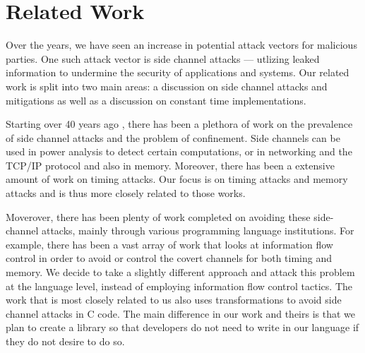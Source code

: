 \section{Related Work}
\label{sec:related}


Over the years, we have seen an increase in potential attack vectors for
malicious parties. One such attack vector is side channel attacks --- utlizing
leaked information to undermine the security of applications and systems.
Our related work is split into two main areas: a discussion on side channel
attacks and mitigations as well as a discussion on constant time
implementations.

Starting over 40 years ago \cite{lampson1973, wray1991, lipner1975}, there has
been a plethora of work on the prevalence of side channel attacks and the
problem of confinement. Side channels can be used in power
analysis\cite{Vaudenay2016,koziel2016} to detect certain computations, or in
networking and the TCP/IP protocol\cite{zander2007,cabuk2004,rowland1997} and
also in memory\cite{liu20152,hund2013,liu2015}. Moreover, there has been a
extensive amount of work on timing attacks\cite{wang2004,kopf2009}. Our focus
is on timing attacks and memory attacks and is thus more closely related to
those works. 

Moverover, there has been plenty of work completed on avoiding these
side-channel attacks, mainly through various programming language institutions.
For example, there has been a vast array of work that looks at information flow
control in order to avoid or control the covert channels for both timing and
memory\cite{planul2013,mitchell2012,stefan2013,stefan2012,buiras2014}. We
decide to take a slightly different approach and attack this problem at the
language level, instead of employing information flow control tactics. The work
that is most closely related to us\cite{molnar2005} also uses transformations
to avoid side channel attacks in C code. The main difference in our work and
theirs is that we plan to create a library so that developers do not need to
write in our language if they do not desire to do so.
